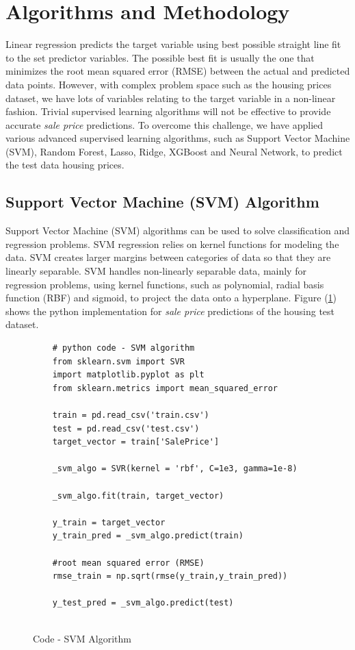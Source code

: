 \documentclass[sigconf]{acmart}
\begin{document}
	
	\section{Algorithms and Methodology}

	Linear regression predicts the target variable using best possible straight line fit to the set predictor variables. The possible best fit is usually the one that minimizes the root mean squared error (RMSE) between the actual and predicted data points. However, with complex problem space such as the housing prices dataset, we have lots of variables relating to the target variable in a non-linear fashion. Trivial supervised learning algorithms will not be effective to provide accurate {\em sale price} predictions. To overcome this challenge, we have applied various advanced supervised learning algorithms, such as Support Vector Machine (SVM), Random Forest, Lasso, Ridge, XGBoost and Neural Network, to predict the test data housing prices.
	
	 
	\subsection{Support Vector Machine (SVM) Algorithm}

	Support Vector Machine (SVM) algorithms can be used to solve classification and regression problems. SVM regression relies on kernel functions for modeling the data. SVM creates larger margins between categories of data so that they are linearly separable. SVM handles non-linearly separable data, mainly for regression problems, using kernel functions, such as polynomial, radial basis function (RBF) and sigmoid, to project the data onto a hyperplane. Figure (\ref{c:svm}) shows the python implementation for {\em sale price} predictions of the housing test dataset.
	
	\begin{figure}[htb]	
	\begin{verbatim}	
	# python code - SVM algorithm
	from sklearn.svm import SVR
	import matplotlib.pyplot as plt
	from sklearn.metrics import mean_squared_error
	
	train = pd.read_csv('train.csv')
	test = pd.read_csv('test.csv')
	target_vector = train['SalePrice']
	
	_svm_algo = SVR(kernel = 'rbf', C=1e3, gamma=1e-8)	
	
	_svm_algo.fit(train, target_vector)    
		
	y_train = target_vector
	y_train_pred = _svm_algo.predict(train)
	
	#root mean squared error (RMSE)
	rmse_train = np.sqrt(rmse(y_train,y_train_pred))
	
	y_test_pred = _svm_algo.predict(test)
	
	\end{verbatim}
	\caption{Code - SVM Algorithm} \label{c:svm} 
	\end{figure}
	
\end{document}
